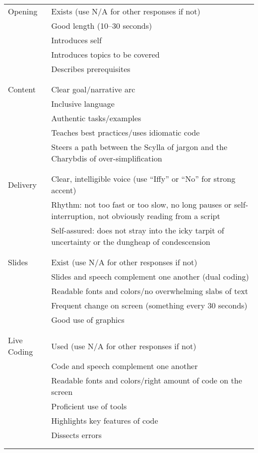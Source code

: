 \noindent
\begin{longtable}{p{}p{}}

  Opening
  & Exists (use N/A for other responses if not) \\
  & Good length (10--30 seconds) \\
  & Introduces self \\
  & Introduces topics to be covered \\
  & Describes prerequisites \\
  \\ [-1.5ex] \hline \\ [-1.5ex]

  Content
  & Clear goal/narrative arc \\
  & Inclusive language \\
  & Authentic tasks/examples \\
  & Teaches best practices/uses idiomatic code \\
  & Steers a path between the Scylla of jargon and the Charybdis of over-simplification \\
  \\ [-1.5ex] \hline \\ [-1.5ex]

  Delivery
  & Clear, intelligible voice (use ``Iffy'' or ``No'' for strong accent) \\
  & Rhythm: not too fast or too slow, no long pauses or self-interruption, not obviously reading from a script \\
  & Self-assured: does not stray into the icky tarpit of uncertainty or the dungheap of condescension \\
  \\ [-1.5ex] \hline \\ [-1.5ex]

  Slides
  & Exist (use N/A for other responses if not) \\
  & Slides and speech complement one another (dual coding) \\
  & Readable fonts and colors/no overwhelming slabs of text \\
  & Frequent change on screen (something every 30 seconds) \\
  & Good use of graphics \\
  \\ [-1.5ex] \hline \\ [-1.5ex]

  Live Coding
  & Used (use N/A for other responses if not) \\
  & Code and speech complement one another \\
  & Readable fonts and colors/right amount of code on the screen \\
  & Proficient use of tools \\
  & Highlights key features of code \\
  & Dissects errors \\
  \\ [-1.5ex] \hline \\ [-1.5ex]


\end{longtable}
